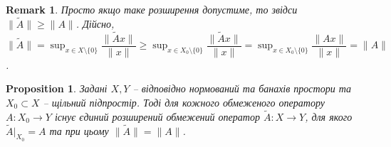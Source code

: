 \documentclass[a4paper, 10pt]{article}
\theoremstyle{theoremdd}
\theoremstyle{theoremdd}
\theoremstyle{theoremdd}
\theoremstyle{theoremdd}
\theoremstyle{theoremdd}
\newtheorem{proposition}[theorem]{Proposition}
\theoremstyle{theoremdd}
\newtheorem{remark}[theorem]{Remark}
\theoremstyle{theoremdd}
\theoremstyle{theoremdd}
\begin{document}
\begin{remark}
Просто якщо таке розширення допустиме, то звідси $\|\tilde{A}\| \geq \|A\|$. Дійсно,\\
$\|\tilde{A}\| = \displaystyle\sup_{x \in X \setminus \{0\}} \dfrac{\|\tilde{A}x\|}{\|x\|} \geq \sup_{x \in X_0 \setminus \{0\}} \dfrac{\|\tilde{A}x\|}{\|x\|} = \sup_{x \in X_0 \setminus \{0\}} \dfrac{\|Ax\|}{\|x\|} = \|A\|$.
\end{remark}

\begin{proposition}
Задані $X,Y$ -- відповідно нормований та банахів простори та $X_0 \subset X$ -- щільний підпростір. Тоді для кожного обмеженого оператору $A \colon X_0 \to Y$ існує єдиний розширений обмежений оператор $\tilde{A} \colon X \to Y$, для якого $\tilde{A}|_{X_0} = A$ та при цьому $\|\tilde{A}\| = \|A\|$.
\end{proposition}
\end{document}
